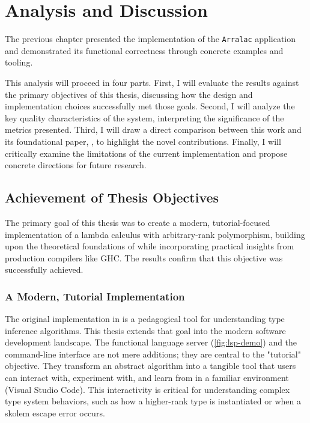 \chapter{Analysis and Discussion}
\label{chap:AnalysisAndDiscussion}

The previous chapter presented the implementation of the \texttt{Arralac} application and demonstrated its functional correctness through concrete examples and tooling.

This analysis will proceed in four parts. First, I will evaluate the results against the primary objectives of this thesis, discussing how the design and implementation choices successfully met those goals. Second, I will analyze the key quality characteristics of the system, interpreting the significance of the metrics presented. Third, I will draw a direct comparison between this work and its foundational paper, \cite{jones-practical-2007}, to highlight the novel contributions. Finally, I will critically examine the limitations of the current implementation and propose concrete directions for future research.

\section{Achievement of Thesis Objectives}
\label{sec:Discussion:Objectives}

The primary goal of this thesis was to create a modern, tutorial-focused implementation of a lambda calculus with arbitrary-rank polymorphism, building upon the theoretical foundations of \cite{jones-practical-2007} while incorporating practical insights from production compilers like GHC. The results confirm that this objective was successfully achieved.

\subsection{A Modern, Tutorial Implementation}
The original implementation in \cite{jones-practical-2007} is a pedagogical tool for understanding type inference algorithms. This thesis extends that goal into the modern software development landscape. The functional language server (\cref{fig:lsp-demo}) and the command-line interface are not mere additions; they are central to the "tutorial" objective. They transform an abstract algorithm into a tangible tool that users can interact with, experiment with, and learn from in a familiar environment (Visual Studio Code). This interactivity is critical for understanding complex type system behaviors, such as how a higher-rank type is instantiated or when a skolem escape error occurs.

